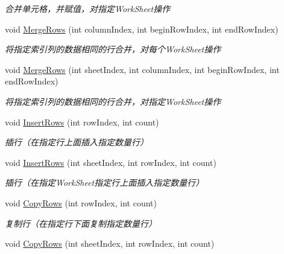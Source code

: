 \begin{DoxyCompactItemize}
\begin{DoxyCompactList}\small\item\em 合并单元格，并赋值，对指定\+Work\+Sheet操作 \end{DoxyCompactList}\item 
void \hyperlink{class_x_c_l_net_tools_1_1_office_1_1_excel_handler_1_1_excel_helper_a6e130b3596ed54ce811fa500ff4df20b}{Merge\+Rows} (int column\+Index, int begin\+Row\+Index, int end\+Row\+Index)
\begin{DoxyCompactList}\small\item\em 将指定索引列的数据相同的行合并，对每个\+Work\+Sheet操作 \end{DoxyCompactList}\item 
void \hyperlink{class_x_c_l_net_tools_1_1_office_1_1_excel_handler_1_1_excel_helper_acbca99c07c2d2b210e1709660d383b97}{Merge\+Rows} (int sheet\+Index, int column\+Index, int begin\+Row\+Index, int end\+Row\+Index)
\begin{DoxyCompactList}\small\item\em 将指定索引列的数据相同的行合并，对指定\+Work\+Sheet操作 \end{DoxyCompactList}\item 
void \hyperlink{class_x_c_l_net_tools_1_1_office_1_1_excel_handler_1_1_excel_helper_a2d4906537fdb886329ba5dbdfe82ed18}{Insert\+Rows} (int row\+Index, int count)
\begin{DoxyCompactList}\small\item\em 插行（在指定行上面插入指定数量行） \end{DoxyCompactList}\item 
void \hyperlink{class_x_c_l_net_tools_1_1_office_1_1_excel_handler_1_1_excel_helper_ae52b03c158a2db80aa61b3db05e9298c}{Insert\+Rows} (int sheet\+Index, int row\+Index, int count)
\begin{DoxyCompactList}\small\item\em 插行（在指定\+Work\+Sheet指定行上面插入指定数量行） \end{DoxyCompactList}\item 
void \hyperlink{class_x_c_l_net_tools_1_1_office_1_1_excel_handler_1_1_excel_helper_a7e024058407b8033da3728d18a100dc1}{Copy\+Rows} (int row\+Index, int count)
\begin{DoxyCompactList}\small\item\em 复制行（在指定行下面复制指定数量行） \end{DoxyCompactList}\item 
void \hyperlink{class_x_c_l_net_tools_1_1_office_1_1_excel_handler_1_1_excel_helper_ae5ca11d360518bfcf0ec30506120adfb}{Copy\+Rows} (int sheet\+Index, int row\+Index, int count)

\end{DoxyCompactItemize}
